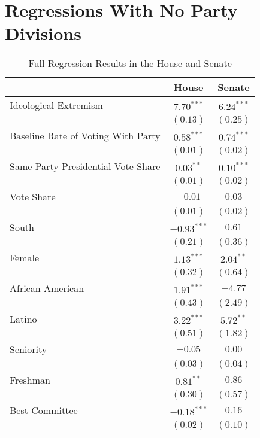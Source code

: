 \documentclass[12pt]{article}
\begin{document}
\pagebreak

\section{Regressions With No Party Divisions}

\begin{table}[H]
	\begin{center}
		\caption{Full Regression Results in the House and Senate}
		\small
		\begin{tabular}{l c c }
			\hline
			& House & Senate \\
			\hline
			Ideological Extremism & $7.70^{***}$  & $6.24^{***}$  \\
			& $(0.13)$      & $(0.25)$      \\
			Baseline Rate of Voting With Party              & $0.58^{***}$  & $0.74^{***}$  \\
			& $(0.01)$      & $(0.02)$      \\
			Same Party Presidential Vote Share      & $0.03^{**}$   & $0.10^{***}$  \\
			& $(0.01)$      & $(0.02)$      \\
			Vote Share            & $-0.01$       & $0.03$        \\
			& $(0.01)$      & $(0.02)$      \\
			South                  & $-0.93^{***}$ & $0.61$        \\
			& $(0.21)$      & $(0.36)$      \\
			Female                 & $1.13^{***}$  & $2.04^{**}$   \\
			& $(0.32)$      & $(0.64)$      \\
			African American                   & $1.91^{***}$  & $-4.77$       \\
			& $(0.43)$      & $(2.49)$      \\
			Latino                 & $3.22^{***}$  & $5.72^{**}$   \\
			& $(0.51)$      & $(1.82)$      \\
			Seniority              & $-0.05$       & $0.00$        \\
			& $(0.03)$      & $(0.04)$      \\
			Freshman               & $0.81^{**}$   & $0.86$        \\
			& $(0.30)$      & $(0.57)$      \\
			Best Committee        & $-0.18^{***}$ & $0.16$        \\
			& $(0.02)$      & $(0.10)$      \\

\end{tabular}
\end{center}
\end{table}
\end{document}
